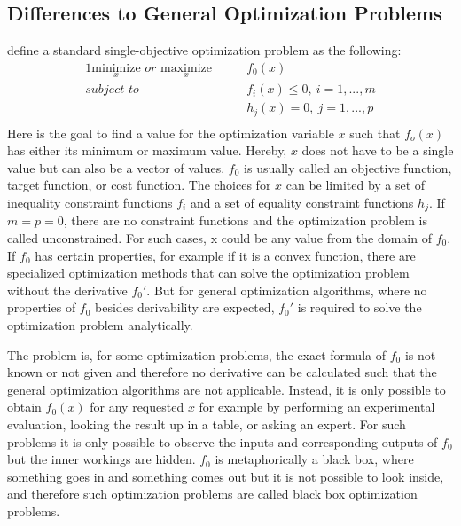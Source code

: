 \subsection{Differences to General Optimization Problems}
\label{sec:theory:optimization:differences}
\textcite{Boyd-Optimization} define a standard single-objective optimization problem as the following:
\begin{alignat*}{1}
    \underset{x}{\mathrm{minimize}} \textit{ or } \underset{x}{\mathrm{maximize}} \qquad & f_0(x)\\
    \textit{subject to} \qquad & f_i(x) \leq 0,\> i=1,...,m\\
                        &  h_j(x) = 0,\> j=1,...,p\\
\end{alignat*}
Here is the goal to find a value for the optimization variable $x$ such that $f_o(x)$ has either its minimum or maximum value.
Hereby, $x$ does not have to be a single value but can also be a vector of values.
$f_0$ is usually called an objective function, target function, or cost function.\newline
The choices for $x$ can be limited by a set of inequality constraint functions $f_i$ and a set of equality constraint functions $h_j$.
If $m=p=0$, there are no constraint functions and the optimization problem is called unconstrained.
For such cases, x could be any value from the domain of $f_0$.\newline
If $f_0$ has certain properties, for example if it is a convex function, there are specialized optimization methods that can solve the optimization problem without the derivative $f_0'$.
But for general optimization algorithms, where no properties of $f_0$ besides derivability are expected, $f_0'$ is required to solve the optimization problem analytically.

The problem is, for some optimization problems, the exact formula of $f_0$ is not known or not given and therefore no derivative can be calculated such that the general optimization algorithms are not applicable.
Instead, it is only possible to obtain $f_0(x)$ for any requested $x$ for example by performing an experimental evaluation, looking the result up in a table, or asking an expert.
For such problems it is only possible to observe the inputs and corresponding outputs of $f_0$ but the inner workings are hidden.
$f_0$ is metaphorically a black box, where something goes in and something comes out but it is not possible to look inside, and therefore such optimization problems are called black box optimization problems.

